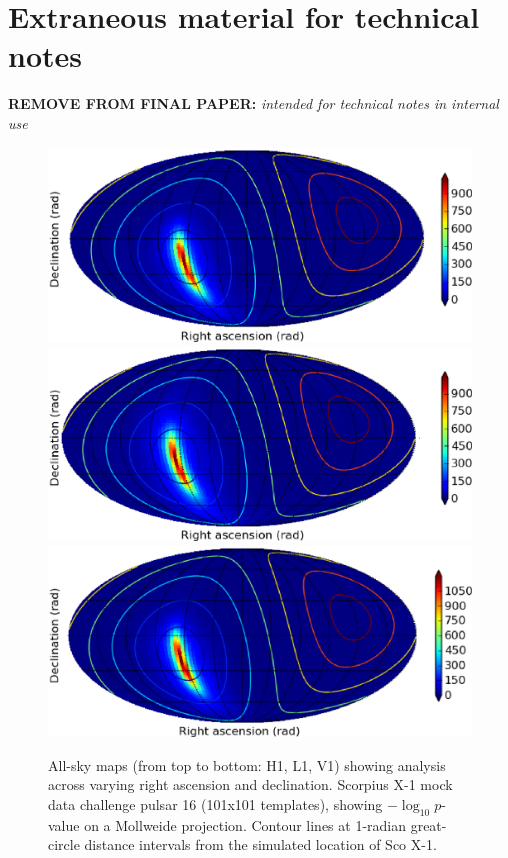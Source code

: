 \section*{Extraneous material for technical notes}
\textbf{REMOVE FROM FINAL PAPER:}
\textit{intended for technical notes in internal use}

\begin{figure}
\begin{center}
\includegraphics[width=0.6\paperwidth,height=0.2\paperheight]{plots/maptrueH1.eps}
\includegraphics[width=0.6\paperwidth,height=0.2\paperheight]{plots/maptrueL1.eps}
\includegraphics[width=0.6\paperwidth,height=0.2\paperheight]{plots/maptrueV1.eps}
\caption{ All-sky maps (from top to bottom: H1, L1, V1) showing analysis across varying right ascension and declination. 
Scorpius X-1 mock data challenge pulsar 16 (101x101 templates), showing $-\log_{10}p$-value on a Mollweide projection.
Contour lines at 1-radian great-circle distance intervals from the simulated location of Sco X-1.
}
\label{scox1-allsky-maps}
\end{center}
\end{figure}



